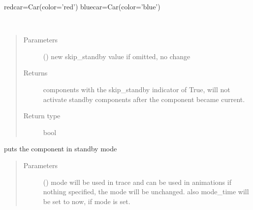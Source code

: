 \documentclass[letterpaper,10pt,english]{sphinxmanual}
\begin{document}
\begin{fulllineitems}
\begin{fulllineitems}
\begin{description}
\begin{description}
\end{description}

\end{description}

redcar=Car(color=’red’) 
bluecar=Car(color=’blue’)

\end{fulllineitems}


\begin{fulllineitems}
\label{\detokenize{Reference:salabim.Component.skip_standby}}~\begin{quote}\begin{description}
\item[{Parameters}] \leavevmode
{} () \textendash{} new skip\_standby value 
if omitted, no change

\item[{Returns}] \leavevmode
{} \textendash{} components with the skip\_standby indicator of True, will not activate standby components after
the component became current.

\item[{Return type}] \leavevmode
bool

\end{description}\end{quote}

\end{fulllineitems}


\begin{fulllineitems}
\label{\detokenize{Reference:salabim.Component.standby}}
puts the component in standby mode
\begin{quote}\begin{description}
\item[{Parameters}] \leavevmode
{} () \textendash{} mode 
will be used in trace and can be used in animations 
if nothing specified, the mode will be unchanged. 
also mode\_time will be set to now, if mode is set.


\end{description}
\end{quote}
\end{fulllineitems}
\end{fulllineitems}
\end{document}
